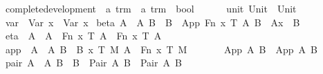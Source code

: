 \begin{implementation}
\isamarkupfalse%
\ complete{\isacharunderscore}development\ {\isacharcolon}{\isacharcolon}\ {\isachardoublequoteopen}{\isacharprime}a\ trm\ {\isasymRightarrow}\ {\isacharprime}a\ trm\ {\isasymRightarrow}\ bool{\isachardoublequoteclose}\ {\isacharparenleft}{\isachardoublequoteopen}{\isacharunderscore}\ {\isachargreater}{\isachargreater}{\isachargreater}\ {\isacharunderscore}{\isachardoublequoteclose}{\isacharparenright}\ \isanewline
\ \ unit{\isacharcolon}\ {\isachardoublequoteopen}Unit\ {\isachargreater}{\isachargreater}{\isachargreater}\ Unit{\isachardoublequoteclose}\isanewline
{\isacharbar}\ var{\isacharcolon}\ \ {\isachardoublequoteopen}{\isacharparenleft}Var\ x{\isacharparenright}\ {\isachargreater}{\isachargreater}{\isachargreater}\ {\isacharparenleft}Var\ x{\isacharparenright}{\isachardoublequoteclose}\isanewline
{\isacharbar}\ beta{\isacharcolon}\ {\isachardoublequoteopen}{\isasymlbrakk}A\ {\isachargreater}{\isachargreater}{\isachargreater}\ A{\isacharprime}{\isacharsemicolon}\ B\ {\isachargreater}{\isachargreater}{\isachargreater}\ B{\isacharprime}{\isasymrbrakk}\ {\isasymLongrightarrow}\ {\isacharparenleft}App\ {\isacharparenleft}Fn\ x\ T\ A{\isacharparenright}\ B{\isacharparenright}\ {\isachargreater}{\isachargreater}{\isachargreater}\ {\isacharparenleft}A{\isacharprime}{\isacharbrackleft}x\ {\isacharcolon}{\isacharcolon}{\isacharequal}\ B{\isacharprime}{\isacharbrackright}{\isacharparenright}{\isachardoublequoteclose}\isanewline
{\isacharbar}\ eta{\isacharcolon}\ \ {\isachardoublequoteopen}A\ {\isachargreater}{\isachargreater}{\isachargreater}\ A{\isacharprime}\ {\isasymLongrightarrow}\ {\isacharparenleft}Fn\ x\ T\ A{\isacharparenright}\ {\isachargreater}{\isachargreater}{\isachargreater}\ {\isacharparenleft}Fn\ x\ T\ A{\isacharprime}{\isacharparenright}{\isachardoublequoteclose}\isanewline
{\isacharbar}\ app{\isacharcolon}\ \ {\isachardoublequoteopen}{\isasymlbrakk}A\ {\isachargreater}{\isachargreater}{\isachargreater}\ A{\isacharprime}{\isacharsemicolon}\ B\ {\isachargreater}{\isachargreater}{\isachargreater}\ B{\isacharprime}{\isacharsemicolon}\ {\isacharparenleft}{\isasymAnd}x\ T\ M{\isachardot}\ A\ {\isasymnoteq}\ Fn\ x\ T\ M{\isacharparenright}{\isasymrbrakk}\isanewline
\ \ \ \ \ \ {\isasymLongrightarrow}\ {\isacharparenleft}App\ A\ B{\isacharparenright}\ {\isachargreater}{\isachargreater}{\isachargreater}\ {\isacharparenleft}App\ A{\isacharprime}\ B{\isacharprime}{\isacharparenright}{\isachardoublequoteclose}\isanewline
{\isacharbar}\ pair{\isacharcolon}\ {\isachardoublequoteopen}{\isasymlbrakk}A\ {\isachargreater}{\isachargreater}{\isachargreater}\ A{\isacharprime}{\isacharsemicolon}\ B\ {\isachargreater}{\isachargreater}{\isachargreater}\ B{\isacharprime}{\isasymrbrakk}\ {\isasymLongrightarrow}\ {\isacharparenleft}Pair\ A\ B{\isacharparenright}\ {\isachargreater}{\isachargreater}{\isachargreater}\ {\isacharparenleft}Pair\ A{\isacharprime}\ B{\isacharprime}{\isacharparenright}{\isachardoublequoteclose}\isanewline

\end{implementation}
